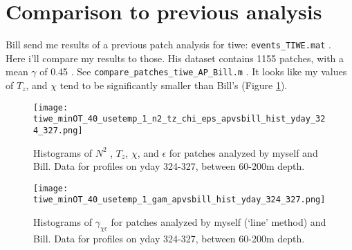 \documentclass[11pt]{article}
\begin{document}
\clearpage
\section{Comparison to previous analysis}

Bill send me results of a previous patch analysis for tiwe: \verb+events_TIWE.mat+ . Here i'll compare my results to those. His dataset contains 1155 patches, with a mean $\gamma$ of 0.45 . See \verb+compare_patches_tiwe_AP_Bill.m+ . It looks like my values of $T_z$, and $\chi$ tend to be significantly smaller than Bill's (Figure \ref{comp_bill_ap_1}).%

\begin{figure}[htbp]
\texttt{[image: tiwe\_minOT\_40\_usetemp\_1\_n2\_tz\_chi\_eps\_apvsbill\_hist\_yday\_324\_327.png]}
\caption{Histograms of $N^2$ , $T_z$, $\chi$, and $\epsilon$ for patches analyzed by myself and Bill. Data for profiles on yday 324-327, between 60-200m depth.}
\label{comp_bill_ap_1}
\end{figure}
%

\begin{figure}[htbp]
\texttt{[image: tiwe\_minOT\_40\_usetemp\_1\_gam\_apvsbill\_hist\_yday\_324\_327.png]}
\caption{Histograms of $\gamma_{\chi\epsilon}$ for patches analyzed by myself (`line' method)  and Bill. Data for profiles on yday 324-327, between 60-200m depth.}
\label{comp_bill_ap_gam}
\end{figure}


%
%
%
%
%
\end{document}
